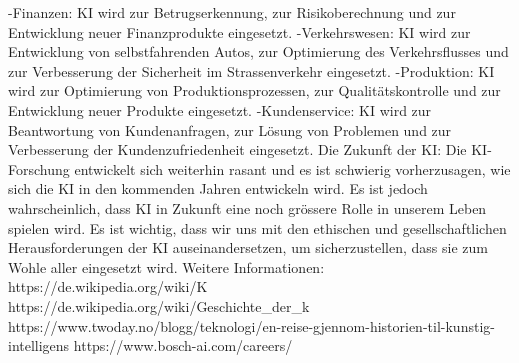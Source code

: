 \documentclass{article}
\begin{document}
{    -Finanzen: KI wird zur Betrugserkennung, zur Risikoberechnung und zur Entwicklung neuer Finanzprodukte eingesetzt.
    -Verkehrswesen: KI wird zur Entwicklung von selbstfahrenden Autos, zur Optimierung des Verkehrsflusses und zur Verbesserung der Sicherheit im Strassenverkehr eingesetzt.
    -Produktion: KI wird zur Optimierung von Produktionsprozessen, zur Qualitätskontrolle und zur Entwicklung neuer Produkte eingesetzt.
    -Kundenservice: KI wird zur Beantwortung von Kundenanfragen, zur Lösung von Problemen und zur Verbesserung der Kundenzufriedenheit eingesetzt.
    Die Zukunft der KI:
    Die KI-Forschung entwickelt sich weiterhin rasant und es ist schwierig vorherzusagen, wie sich die KI in den kommenden Jahren entwickeln wird. Es ist jedoch wahrscheinlich, dass KI in Zukunft eine noch grössere Rolle in unserem Leben spielen wird. Es ist wichtig, dass wir uns mit den ethischen und gesellschaftlichen Herausforderungen der KI auseinandersetzen, um sicherzustellen, dass sie zum Wohle aller eingesetzt wird.
    Weitere Informationen:
    https://de.wikipedia.org/wiki/K%
    https://de.wikipedia.org/wiki/Geschichte_der_k%
    https://www.twoday.no/blogg/teknologi/en-reise-gjennom-historien-til-kunstig-intelligens
    https://www.bosch-ai.com/careers/
    
}
\end{document}
